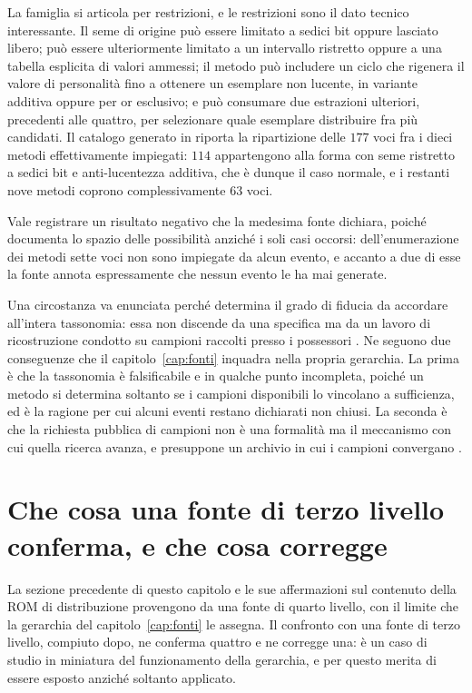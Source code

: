 La famiglia si articola per restrizioni, e le restrizioni sono il dato tecnico interessante. Il seme di origine può essere limitato a sedici bit oppure lasciato libero; può essere ulteriormente limitato a un intervallo ristretto oppure a una tabella esplicita di valori ammessi; il metodo può includere un ciclo che rigenera il valore di personalità fino a ottenere un esemplare non lucente, in variante additiva oppure per or esclusivo; e può consumare due estrazioni ulteriori, precedenti alle quattro, per selezionare quale esemplare distribuire fra più candidati. Il catalogo generato in  riporta la ripartizione delle $177$ voci fra i dieci metodi effettivamente impiegati: $114$ appartengono alla forma con seme ristretto a sedici bit e anti-lucentezza additiva, che è dunque il caso normale, e i restanti nove metodi coprono complessivamente $63$ voci.

Vale registrare un risultato negativo che la medesima fonte dichiara, poiché documenta lo spazio delle possibilità anziché i soli casi occorsi: dell'enumerazione dei metodi sette voci non sono impiegate da alcun evento, e accanto a due di esse la fonte annota espressamente che nessun evento le ha mai generate.

Una circostanza va enunciata perché determina il grado di fiducia da accordare all'intera tassonomia: essa non discende da una specifica ma da un lavoro di ricostruzione condotto su campioni raccolti presso i possessori \cite{pp-algoritmi-eventi}. Ne seguono due conseguenze che il capitolo~\ref{cap:fonti} inquadra nella propria gerarchia. La prima è che la tassonomia è falsificabile e in qualche punto incompleta, poiché un metodo si determina soltanto se i campioni disponibili lo vincolano a sufficienza, ed è la ragione per cui alcuni eventi restano dichiarati non chiusi. La seconda è che la richiesta pubblica di campioni non è una formalità ma il meccanismo con cui quella ricerca avanza, e presuppone un archivio in cui i campioni convergano \cite{eventsgallery}.

\section{Che cosa una fonte di terzo livello conferma, e che cosa corregge}

La sezione precedente di questo capitolo e le sue affermazioni sul contenuto della ROM di distribuzione provengono da una fonte di quarto livello, con il limite che la gerarchia del capitolo~\ref{cap:fonti} le assegna. Il confronto con una fonte di terzo livello, compiuto dopo, ne conferma quattro e ne corregge una: è un caso di studio in miniatura del funzionamento della gerarchia, e per questo merita di essere esposto anziché soltanto applicato.


